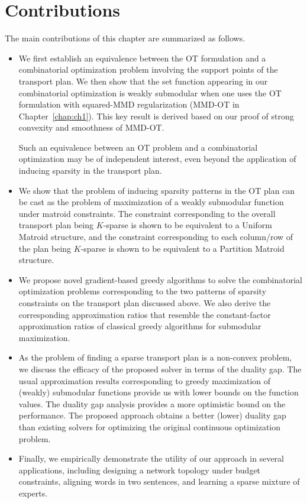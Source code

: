 \section{Contributions}
The main contributions of this chapter are summarized as follows.
\begin{itemize}%
    \item We first establish an equivalence between the OT formulation and a combinatorial optimization problem involving the support points of the transport plan. We then show that the set function appearing in our combinatorial optimization is weakly submodular when one uses the OT formulation with squared-MMD regularization (MMD-OT in Chapter~\ref{chap:ch1}). This key result is derived based on our proof of strong convexity and smoothness of MMD-OT.
    
    Such an equivalence between an OT problem and a combinatorial optimization may be of independent interest, even beyond the application of inducing sparsity in the transport plan.
    \item We show that the problem of inducing sparsity patterns in the OT plan can be cast as the problem of maximization of a weakly submodular function under matroid constraints. The constraint corresponding to the overall transport plan being $K$-sparse is shown to be equivalent to a Uniform Matroid structure, and the constraint corresponding to each column/row of the plan being $K$-sparse is shown to be equivalent to a Partition Matroid structure.
    \item We propose novel gradient-based greedy algorithms to solve the combinatorial optimization problems corresponding to the two patterns of sparsity constraints on the transport plan discussed above. We also derive the corresponding approximation ratios that resemble the constant-factor approximation ratios of classical greedy algorithms for submodular maximization. 
\item As the problem of finding a sparse transport plan is a non-convex problem, we discuss the efficacy of the proposed solver in terms of the duality gap. The usual approximation results corresponding to greedy maximization of (weakly) submodular functions provide us with lower bounds on the function values. The duality gap analysis provides a more optimistic bound on the performance. The proposed approach obtains a better (lower) duality gap than existing solvers for optimizing the original continuous optimization problem.
\item Finally, we empirically demonstrate the utility of our approach in several applications, including designing a network topology under budget constraints, aligning words in two sentences, and learning a sparse mixture of experts.
\end{itemize}
